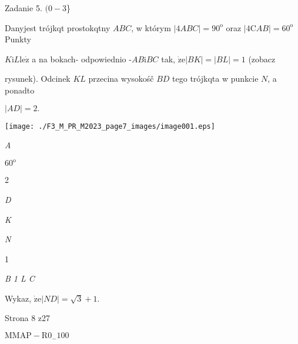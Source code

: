\documentclass[a4paper,12pt]{article}
\begin{document}
Zadanie 5. $(0-3$\}

Danyjest trójkqt prostokqtny $ABC$, w którym $|4ABC|=90^{\mathrm{o}}$ oraz $|4\mathrm{C}AB|=60^{\mathrm{o}}$ Punkty

$K \mathrm{i} L \mathrm{l}\mathrm{e}\dot{\mathrm{z}}$ a na bokach- odpowiednio -$AB \mathrm{i} BC$ tak, $\dot{\mathrm{z}}\mathrm{e} |BK|=|BL|=1$ (zobacz

rysunek). Odcinek $KL$ przecina wysokośč $BD$ tego trójkqta w punkcie $N$, a ponadto

$|AD|=2.$
\begin{center}
\texttt{[image: ./F3\_M\_PR\_M2023\_page7\_images/image001.eps]}
\end{center}
{\it A}

$60^{\mathrm{o}}$

2

{\it D}

{\it K}

{\it N}

1

{\it B 1 L  C}

Wykaz, $\dot{\mathrm{z}}\mathrm{e} |ND|=\sqrt{3}+1.$

Strona 8 z27

$\mathrm{M}\mathrm{M}\mathrm{A}\mathrm{P}-\mathrm{R}0_{-}100$
\end{document}
